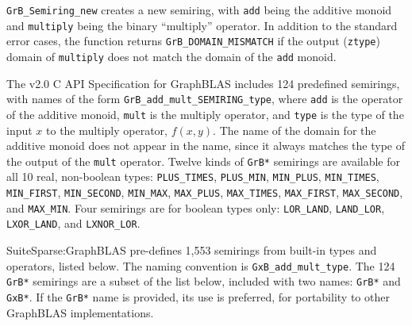 \documentclass[12pt]{article}
\begin{document}
\verb'GrB_Semiring_new' creates a new semiring, with \verb'add' being the
additive monoid and \verb'multiply' being the binary ``multiply'' operator.  In
addition to the standard error cases, the function returns
\verb'GrB_DOMAIN_MISMATCH' if the output (\verb'ztype') domain of
\verb'multiply' does not match the domain of the \verb'add' monoid.

The v2.0 C API Specification for GraphBLAS includes 124 predefined semirings,
with names of the form \verb'GrB_add_mult_SEMIRING_type', where \verb'add' is
the operator of the additive monoid, \verb'mult' is the multiply operator, and
\verb'type' is the type of the input $x$ to the multiply operator, $f(x,y)$.
The name of the domain for the additive monoid does not appear in the name,
since it always matches the type of the output of the \verb'mult' operator.
Twelve kinds of \verb'GrB*' semirings are available for all 10 real, non-boolean types:
    \verb'PLUS_TIMES', \verb'PLUS_MIN',
    \verb'MIN_PLUS', \verb'MIN_TIMES', \verb'MIN_FIRST', \verb'MIN_SECOND', \verb'MIN_MAX',
    \verb'MAX_PLUS', \verb'MAX_TIMES', \verb'MAX_FIRST', \verb'MAX_SECOND', and \verb'MAX_MIN'.
Four semirings are for boolean types only:
    \verb'LOR_LAND', \verb'LAND_LOR', \verb'LXOR_LAND', and \verb'LXNOR_LOR'.

SuiteSparse:GraphBLAS pre-defines 1,553 semirings from built-in types and
operators, listed below.  The naming convention is \verb'GxB_add_mult_type'.
The 124 \verb'GrB*' semirings are a subset of the list below, included with two
names: \verb'GrB*' and \verb'GxB*'.  If the \verb'GrB*' name is provided, its
use is preferred, for portability to other GraphBLAS implementations.
\end{document}
